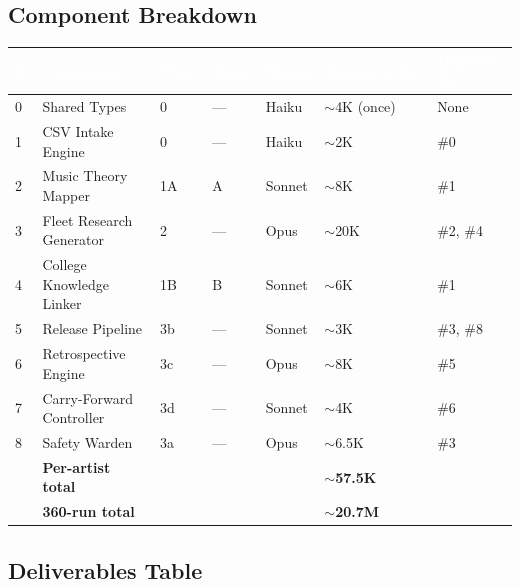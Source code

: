 \documentclass[11pt,letterpaper]{article}
\newcommand{\tblhdr}[1]{\textbf{\sffamily\textcolor{white}{#1}}}
\begin{document}
\subsection{Component Breakdown}

\begin{center}
\begin{tabularx}{\textwidth}{C{0.3cm}L{3.8cm}C{1cm}C{1.2cm}C{1.5cm}C{2cm}L{2.5cm}}
\toprule
{}
\tblhdr{\#} & \tblhdr{Component} & \tblhdr{Wave} & \tblhdr{Track} & \tblhdr{Model} & \tblhdr{Tokens/Artist} & \tblhdr{Depends On} \\
 & Shared Types & 0 & --- & Haiku & $\sim$4K (once) & None \\
1 & CSV Intake Engine & 0 & --- & Haiku & $\sim$2K & \#0 \\
2 & Music Theory Mapper & 1A & A & Sonnet & $\sim$8K & \#1 \\
3 & Fleet Research Generator & 2 & --- & Opus & $\sim$20K & \#2, \#4 \\
4 & College Knowledge Linker & 1B & B & Sonnet & $\sim$6K & \#1 \\
5 & Release Pipeline & 3b & --- & Sonnet & $\sim$3K & \#3, \#8 \\
6 & Retrospective Engine & 3c & --- & Opus & $\sim$8K & \#5 \\
7 & Carry-Forward Controller & 3d & --- & Sonnet & $\sim$4K & \#6 \\
8 & Safety Warden & 3a & --- & Opus & $\sim$6.5K & \#3 \\
\midrule
{}
& \textbf{Per-artist total} & & & & $\sim$\textbf{57.5K} & \\
& \textbf{360-run total} & & & & $\sim$\textbf{20.7M} & \\
\bottomrule
\end{tabularx}
\end{center}

\subsection{Deliverables Table}
\end{document}
